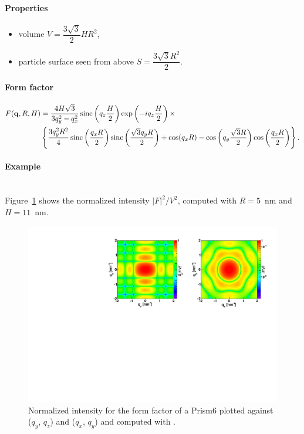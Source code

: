 \paragraph{Properties}
\begin{itemize}
\item volume $V = \dfrac{3\sqrt{3}}{2}H R^2$,
\item particle surface seen from above $S =\dfrac{3\sqrt{3}R^2}{2}$.
\end{itemize}

\paragraph{Form factor}
\begin{align*}
F(\mathbf{q}, R, H) &= \frac{4H\sqrt{3}}{3q_y^2 - q_x^2}
\operatorname{sinc}\left(q_z\frac{H}{2}\right) \exp\left(-i q_z\frac{ H}{2}\right)\times\\
&\left\{\frac{3q_y^2R^2}{4} \operatorname{sinc}\left(\frac{q_x
  R}{2}\right)\operatorname{sinc}\left(\frac{\sqrt{3}q_yR }{2}\right)+ \cos(q_x R)-\cos\left(q_y
\frac{\sqrt{3}R}{2}\right) \cos\left(\frac{q_x R}{2}\right)\right\}.
\end{align*}

\paragraph{Example}\strut\\
Figure~\ref{fig:FFprism6Ex} shows the normalized intensity
$|F|^2/V^2$, computed with $R=5$~nm and \mbox{$H=11$~nm.}

\begin{figure}[h]
\begin{center}
\includegraphics[angle=-90,width=\textwidth]{fig/ff/figffprism6.pdf}
\end{center}
\caption{Normalized intensity for the form factor of a Prism6 plotted against ($q_y$, $q_z$) and ($q_x$, $q_y$) and computed with .}
\label{fig:FFprism6Ex}
\end{figure}


